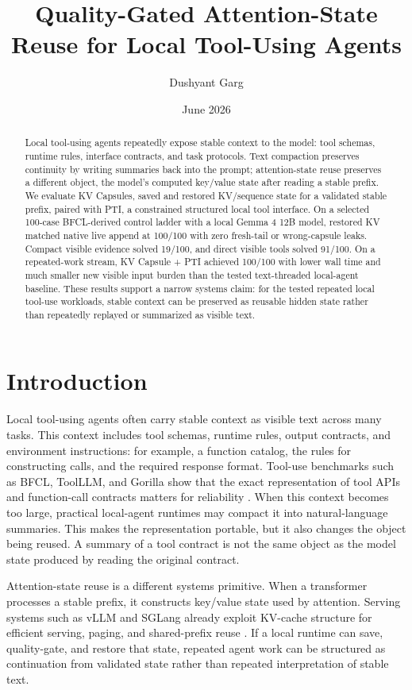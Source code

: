 \documentclass[11pt]{article}
\title{Quality-Gated Attention-State Reuse for Local Tool-Using Agents}
\author{Dushyant Garg}
\date{June 2026}
\begin{document}
\maketitle

\begin{abstract}
Local tool-using agents repeatedly expose stable context to the model: tool schemas, runtime rules, interface contracts, and task protocols. Text compaction preserves continuity by writing summaries back into the prompt; attention-state reuse preserves a different object, the model's computed key/value state after reading a stable prefix. We evaluate KV Capsules, saved and restored KV/sequence state for a validated stable prefix, paired with PTI, a constrained structured local tool interface. On a selected 100-case BFCL-derived control ladder with a local Gemma 4 12B model, restored KV matched native live append at 100/100 with zero fresh-tail or wrong-capsule leaks. Compact visible evidence solved 19/100, and direct visible tools solved 91/100. On a repeated-work stream, KV Capsule + PTI achieved 100/100 with lower wall time and much smaller new visible input burden than the tested text-threaded local-agent baseline. These results support a narrow systems claim: for the tested repeated local tool-use workloads, stable context can be preserved as reusable hidden state rather than repeatedly replayed or summarized as visible text.
\end{abstract}

\section{Introduction}

Local tool-using agents often carry stable context as visible text across many tasks. This context includes tool schemas, runtime rules, output contracts, and environment instructions: for example, a function catalog, the rules for constructing calls, and the required response format. Tool-use benchmarks such as BFCL, ToolLLM, and Gorilla show that the exact representation of tool APIs and function-call contracts matters for reliability \cite{bfcl2025,qin2023toollm,patil2023gorilla}. When this context becomes too large, practical local-agent runtimes may compact it into natural-language summaries. This makes the representation portable, but it also changes the object being reused. A summary of a tool contract is not the same object as the model state produced by reading the original contract.

Attention-state reuse is a different systems primitive. When a transformer processes a stable prefix, it constructs key/value state used by attention. Serving systems such as vLLM and SGLang already exploit KV-cache structure for efficient serving, paging, and shared-prefix reuse \cite{kwon2023pagedattention,zheng2023sglang}. If a local runtime can save, quality-gate, and restore that state, repeated agent work can be structured as continuation from validated state rather than repeated interpretation of stable text.
\end{document}

